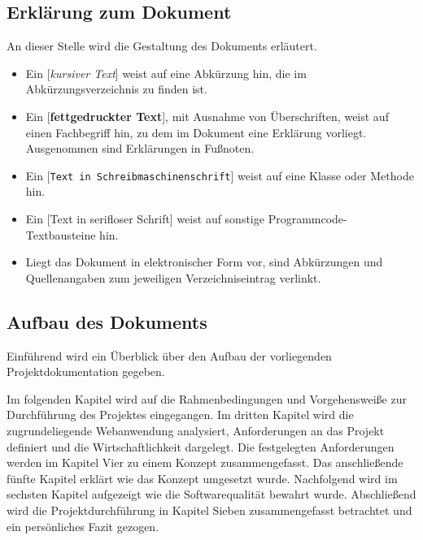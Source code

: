 \subsection{Erklärung zum Dokument} 
\label{sub:Erklärung zum Dokument}
An dieser Stelle wird die Gestaltung des Dokuments erläutert. 
\begin{itemize}[noitemsep]
  \item Ein {[\textit{kursiver Text}]} weist auf eine Abkürzung hin, die im Abkürzungsverzeichnis zu finden ist.
  \item Ein {[\textbf{fettgedruckter Text}]}, mit Ausnahme von Überschriften, weist auf einen Fachbegriff hin, zu dem im Dokument
  eine Erklärung vorliegt. Ausgenommen sind Erklärungen in Fußnoten.
  \item Ein {[\texttt{Text in Schreibmaschinenschrift}]} weist auf eine Klasse oder Methode hin.
  \item Ein {[\textsf{Text in serifloser Schrift}]} weist auf sonstige Programmcode-Textbausteine hin.
  \item Liegt das Dokument in elektronischer Form vor, sind Abkürzungen und Quellenangaben zum jeweiligen Verzeichniseintrag
  verlinkt.
\end{itemize}

\subsection{Aufbau des Dokuments} 
\label{sub:Aufbau des Dokuments}
Einführend wird ein Überblick über den Aufbau der vorliegenden Projektdokumentation gegeben.

Im folgenden Kapitel wird auf die Rahmenbedingungen und Vorgehensweiße zur Durchführung des Projektes eingegangen.
Im dritten Kapitel wird die zugrundeliegende Webanwendung analysiert, Anforderungen an das Projekt definiert und die
Wirtschaftlichkeit dargelegt.
Die festgelegten Anforderungen werden im Kapitel Vier zu einem Konzept zusammengefasst.
Das anschließende fünfte Kapitel erklärt wie das Konzept umgesetzt wurde.
Nachfolgend wird im sechsten Kapitel aufgezeigt wie die Softwarequalität bewahrt wurde.
Abschließend wird die Projektdurchführung in Kapitel Sieben zusammengefasst betrachtet und ein persönliches Fazit gezogen.

